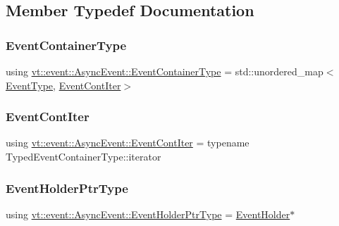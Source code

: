 \subsection{Member Typedef Documentation}
\mbox{\label{structvt_1_1event_1_1_async_event_a391e9ac6236bd3dc5c884b8bc7e48257}} 
\subsubsection{\texorpdfstring{Event\+Container\+Type}{EventContainerType}}
{\footnotesize\ttfamily using \hyperlink{structvt_1_1event_1_1_async_event_a391e9ac6236bd3dc5c884b8bc7e48257}{vt\+::event\+::\+Async\+Event\+::\+Event\+Container\+Type} =  std\+::unordered\+\_\+map$<$\hyperlink{namespacevt_a009267401def7ae8bf201892222d060f}{Event\+Type}, \hyperlink{structvt_1_1event_1_1_async_event_a0f9634db3d6887c4a22076f6b9054e93}{Event\+Cont\+Iter}$>$}

\mbox{\label{structvt_1_1event_1_1_async_event_a0f9634db3d6887c4a22076f6b9054e93}} 
\subsubsection{\texorpdfstring{Event\+Cont\+Iter}{EventContIter}}
{\footnotesize\ttfamily using \hyperlink{structvt_1_1event_1_1_async_event_a0f9634db3d6887c4a22076f6b9054e93}{vt\+::event\+::\+Async\+Event\+::\+Event\+Cont\+Iter} =  typename Typed\+Event\+Container\+Type\+::iterator}

\mbox{\label{structvt_1_1event_1_1_async_event_aaa94fd7e3a63b17dc5b5e5751e5d05e8}} 
\subsubsection{\texorpdfstring{Event\+Holder\+Ptr\+Type}{EventHolderPtrType}}
{\footnotesize\ttfamily using \hyperlink{structvt_1_1event_1_1_async_event_aaa94fd7e3a63b17dc5b5e5751e5d05e8}{vt\+::event\+::\+Async\+Event\+::\+Event\+Holder\+Ptr\+Type} =  \hyperlink{structvt_1_1event_1_1_event_holder}{Event\+Holder}$\ast$}

